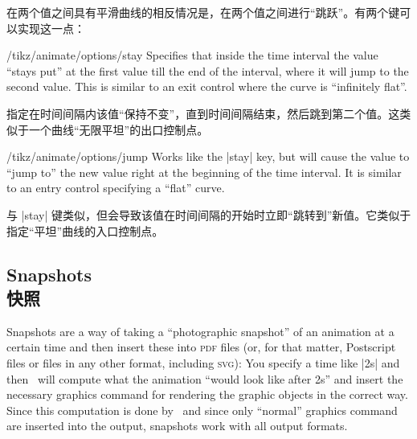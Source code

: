 在两个值之间具有平滑曲线的相反情况是，在两个值之间进行“跳跃”。有两个键可以实现这一点：

\begin{key}{/tikz/animate/options/stay}
    Specifies that inside the time interval the value ``stays put'' at the
    first value till the end of the interval, where it will jump to the second
    value. This is similar to an exit control where the curve is ``infinitely
    flat''.
    
    指定在时间间隔内该值“保持不变”，直到时间间隔结束，然后跳到第二个值。这类似于一个曲线“无限平坦”的出口控制点。

\begin{codeexample}[
    preamble={\usetikzlibrary{animations}},
    animation list={0.5,1,1.5,2,2.5},
]
\end{codeexample}
\end{key}

\begin{key}{/tikz/animate/options/jump}
    Works like the |stay| key, but will cause the value to ``jump to'' the new
    value right at the beginning of the time interval. It is similar to an
    entry control specifying a ``flat'' curve.
    
    与 |stay| 键类似，但会导致该值在时间间隔的开始时立即“跳转到”新值。它类似于指定“平坦”曲线的入口控制点。


\begin{codeexample}[
    preamble={\usetikzlibrary{animations}},
    animation list={0.5,1,1.5,2,2.5},
]
\end{codeexample}
\end{key}


\subsection{Snapshots\\快照}
\label{section-anim-snap}

Snapshots are a way of taking a ``photographic snapshot'' of an animation at a
certain time and then insert these into \textsc{pdf} files (or, for that
matter, Postscript files or files in any other format, including \textsc{svg}):
You specify a time like |2s| and then \tikzname\ will compute what the
animation ``would look like after 2s'' and insert the necessary graphics
command for rendering the graphic objects in the correct way. Since this
computation is done by \tikzname\ and since only ``normal'' graphics command
are inserted into the output, snapshots work with all output formats.

